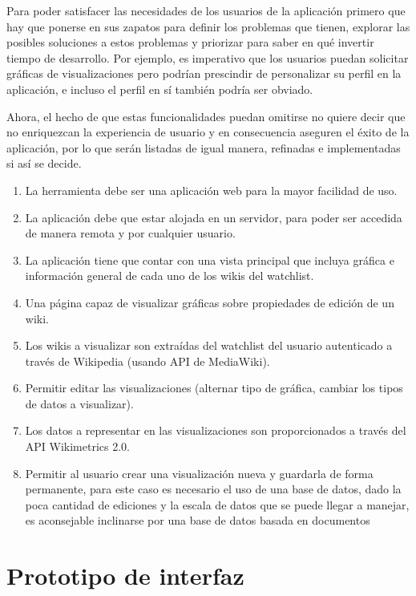     Para poder satisfacer las necesidades de los usuarios de la aplicación primero que hay que ponerse en sus zapatos para definir los problemas que tienen, explorar las posibles soluciones a estos problemas y priorizar para saber en qué invertir tiempo de desarrollo. Por ejemplo, es imperativo que los usuarios puedan solicitar gráficas de visualizaciones pero podrían prescindir de personalizar su perfil en la aplicación, e incluso el perfil en sí también podría ser obviado.

    Ahora, el hecho de que estas funcionalidades puedan omitirse no quiere decir que no enriquezcan la experiencia de usuario y en consecuencia aseguren el éxito de la aplicación, por lo que serán listadas de igual manera, refinadas e implementadas si así se decide.


\begin{enumerate}
    \item{La herramienta debe ser una aplicación web para la mayor facilidad de uso.}
    \item{La aplicación debe que estar alojada en un servidor, para poder ser accedida de manera remota y por cualquier usuario.}
    \item{La aplicación tiene que contar con una vista principal que incluya gráfica e información general de cada uno de los wikis del watchlist.}
    \item{Una página capaz de visualizar gráficas sobre propiedades de edición de un wiki.}
    \item{Los wikis a visualizar son extraídas del watchlist del usuario autenticado a través de Wikipedia (usando API de MediaWiki).}
    \item{Permitir editar las visualizaciones (alternar tipo de gráfica, cambiar los tipos de datos a visualizar).}
    \item{Los datos a representar en las visualizaciones son proporcionados a través del API Wikimetrics 2.0.}
    \item{Permitir al usuario crear una visualización nueva y guardarla de forma permanente, para este caso es necesario el uso de una base de datos, dado la poca cantidad de ediciones y la escala de datos que se puede llegar a manejar, es aconsejable inclinarse por una base de datos basada en  documentos}
\end{enumerate}

\section{Prototipo de interfaz}


